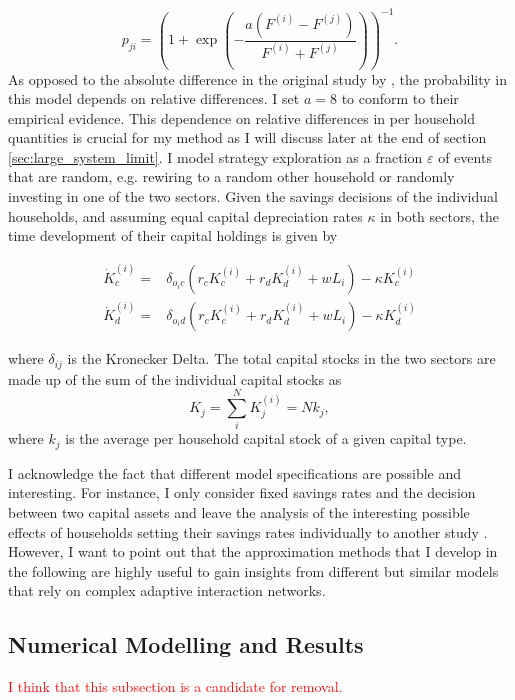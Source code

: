 \begin{equation}
	p_{ji} =  \left(1 + \exp \left(- \frac{a(F^{(i)} - F^{(j)})}{F^{(i)} + F^{(j)}} \right) \right)^{-1}.
    \label{eq:approx_ip}
\end{equation}
As opposed to the absolute difference in the original study by \cite{Traulsen2010}, the probability in this model depends on relative differences. 
I set $a = 8$ to conform to their empirical evidence. This dependence on relative differences in per household quantities is crucial for my method as I will discuss later at the end of section \ref{sec:large_system_limit}.
I model strategy exploration as a fraction $\varepsilon$ of events that are random, e.g. rewiring to a random other household or randomly investing in one of the two sectors.
Given the savings decisions of the individual households, and assuming equal capital depreciation rates $\kappa$ in both sectors, the time development of their capital holdings is given by

\begin{align}
	\dot{K}_c^{(i)} =& \delta_{o_ic} \left( r_c K_c^{(i)} + r_d K_d^{(i)} + w L_i \right) - \kappa K_c^{(i)} \label{eq:approx_ci}\\
	\dot{K}_d^{(i)} =& \delta_{o_id} \left( r_c K_c^{(i)} + r_d K_d^{(i)} + w L_i \right) - \kappa K_d^{(i)} \label{eq:approx_di}
\end{align}

where $\delta_{ij}$ is the Kronecker Delta. The total capital stocks in the two sectors are made up of the sum of the individual capital stocks as
\begin{equation}
K_j = \sum_i^N K_j^{(i)} = N k_j,
\end{equation}
where $k_j$ is the average per household capital stock of a given capital type.

I acknowledge the fact that different model specifications are possible and interesting.
For instance, I only consider fixed savings rates and the decision between two capital assets and leave the analysis of the interesting possible effects of households setting their savings rates individually to another study \citep{Asano2019}.
However, I want to point out that the approximation methods that I develop in the following are highly useful to gain insights from different but similar models that rely on complex adaptive interaction networks.


   
\subsection{Numerical Modelling and Results} 
\label{sec:numerical_results}
\textcolor{red}{I think that this subsection is a candidate for removal.}\\

